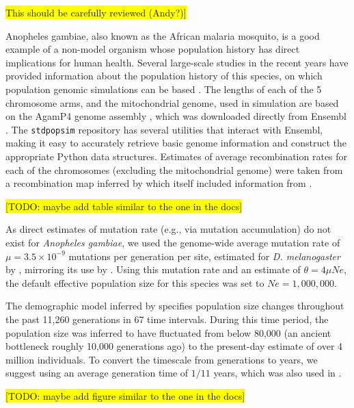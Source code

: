 \documentclass[hidelinks]{article}
\newcommand{\stdpopsim}{\texttt{stdpopsim}\xspace}
\begin{document}
\colorbox{yellow}{This should be carefully reviewed (Andy?)]}

Anopheles gambiae, also known as the African malaria mosquito, is a good example
of a non-model organism whose population history has direct implications for human health.
Several large-scale studies in the recent years have provided information about the
population history of this species, on which population genomic simulations can be based \citep[e.g.,][]{Miles2017, clarkson2020genome}.
The lengths of each of the 5 chromosome arms, and the mitochondrial genome,
used in simulation are based on the AgamP4 genome assembly \citep{Sharakhova2007}, which 
was downloaded directly from Ensembl \citep{ensembl2021}.
The \stdpopsim repository has several utilities that interact with Ensembl,
making it easy to accurately retrieve basic genome information and construct the appropriate Python data structures.
Estimates of average recombination rates for each of the chromosomes (excluding the mitochondrial genome)
were taken from a recombination map inferred by \cite{Pombi2006} which itself included information from
\citet{zheng1996integrated}.


\colorbox{yellow}{[TODO:  maybe add table similar to the one in the docs]}

As direct estimates of mutation rate (e.g., via mutation accumulation) do not exist for \emph{Anopheles gambiae},
we used the genome-wide average mutation rate of $\mu=3.5 \times 10^{-9}$ mutations per generation per site,
estimated for \emph{D. melanogaster} by \cite{Keightley2009}, mirroring its use by \cite{Miles2017}.
Using this mutation rate and an estimate of $\theta=4\mu Ne$, the default effective population size
for this species was set to $Ne=1,000,000$.

The demographic model inferred by \cite{Miles2017} specifies
population size changes throughout the past 11,260 generations in 67 time intervals.
During this time period, the population size was inferred to have fluctuated from below 80,000
(an ancient bottleneck roughly 10,000 generations ago) to the present-day estimate of over 4 million individuals.
To convert the timescale from generations to years, we suggest using an average generation time of $1/11$ years,
which was also used in \cite{Miles2017}.

\colorbox{yellow}{[TODO:  maybe add figure similar to the one in the docs]}
\end{document}
